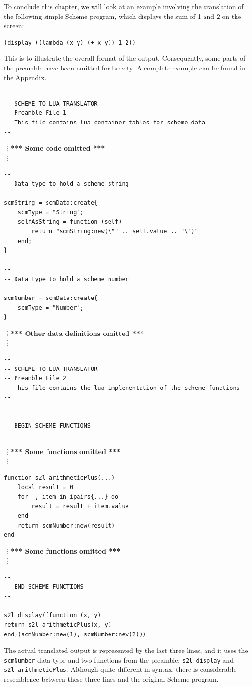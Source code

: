 To conclude this chapter, we will look at an example involving the translation
of the following simple Scheme program, which displays the sum of 1 and 2 on the
screen:
\begin{framed}
\centering
\texttt{(display ((lambda (x y) (+ x y)) 1 2))}
\end{framed}
This is to illustrate the overall format of the output. Consequently, some parts
of the preamble have been omitted for brevity. A complete example can be found
in the Appendix.
\begin{framed}
\scriptsize
\begin{verbatim}
--
-- SCHEME TO LUA TRANSLATOR
-- Preamble File 1
-- This file contains lua container tables for scheme data
--
\end{verbatim}
\vdots \textbf{*** Some code omitted ***}\\ \vdots
\begin{verbatim}
--
-- Data type to hold a scheme string
--
scmString = scmData:create{
    scmType = "String";
    selfAsString = function (self)
        return "scmString:new(\"" .. self.value .. "\")"
    end;
}

--
-- Data type to hold a scheme number
--
scmNumber = scmData:create{
    scmType = "Number";
}
\end{verbatim}
\vdots \textbf{*** Other data definitions omitted ***}\\ \vdots
\begin{verbatim}
--
-- SCHEME TO LUA TRANSLATOR
-- Preamble File 2
-- This file contains the lua implementation of the scheme functions
--

--
-- BEGIN SCHEME FUNCTIONS
--
\end{verbatim}
\vdots \textbf{*** Some functions omitted ***}\\ \vdots
\begin{verbatim}
function s2l_arithmeticPlus(...)
    local result = 0
    for _, item in ipairs{...} do
        result = result + item.value
    end
    return scmNumber:new(result)
end
\end{verbatim}
\vdots \textbf{*** Some functions omitted ***}\\ \vdots
\begin{verbatim}
--
-- END SCHEME FUNCTIONS
--

s2l_display((function (x, y)
return s2l_arithmeticPlus(x, y)
end)(scmNumber:new(1), scmNumber:new(2)))
\end{verbatim}
\end{framed}
The actual translated output is represented by the last three lines, and it uses
the \texttt{scmNumber} data type and two functions from the preamble:
\texttt{s2l\_display} and \texttt{s2l\_arithmeticPlus}. Although quite different
in syntax, there is considerable resemblence between these three lines and the
original Scheme program.
